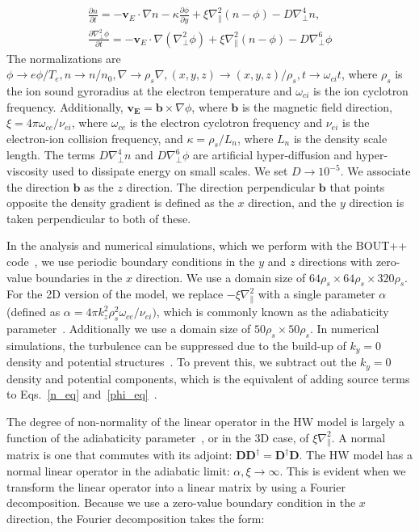 \documentclass[twocolumn,showkeys,superscriptaddress]{revtex4}
\def\beqar{\begin{eqnarray}}
\def\eeqar{\end{eqnarray}}
\newcommand{\pdiff}[2]{\frac{\partial#1}{\partial#2}}
\def\grad{\nabla}
\newcommand{\gradpar}{\grad_\parallel}
\newcommand{\gradperp}{\grad_\perp}
\begin{document}
\beqar
\label{n_eq}
\pdiff{n}{t} = - {\mathbf v_E} \cdot \grad n - \kappa \pdiff{\phi}{y} + \xi \gradpar^2 (n - \phi) - D \gradperp^4 n, \\
\label{phi_eq}
\pdiff{\gradperp^2 \phi}{t} = - {\mathbf v_E} \cdot \grad (\gradperp^2 \phi) + \xi \gradpar^2 (n - \phi) - D \gradperp^6 \phi
\eeqar
The normalizations are $\phi \to e \phi/T_e, n \to n/n_0, \grad \to \rho_s \grad , (x,y,z) \to (x,y,z)/\rho_s, t \to \omega_{ci} t $, where $\rho_s$ is the ion sound gyroradius at the electron temperature and $\omega_{ci}$ is
the ion cyclotron frequency. Additionally, $\mathbf{v_E} = \mathbf{b} \times \grad \phi$, where $\mathbf{b}$ is the magnetic field direction, $\xi = 4 \pi \omega_{ce}/\nu_{ei}$, where $\omega_{ce}$ is the electron cyclotron
frequency and $\nu_{ei}$ is the electron-ion collision frequency,
and $\kappa = \rho_s/L_n$, where $L_n$ is the density scale length. The terms $D \gradperp^4 n$ and $D \gradperp^6 \phi$ are artificial hyper-diffusion and hyper-viscosity used to dissipate
energy on small scales. We set $D \to 10^{-5}$.
We associate the direction $\mathbf{b}$ as the $z$ direction. The direction perpendicular $\mathbf{b}$ that
points opposite the density gradient is defined as the $x$ direction, and the $y$ direction is taken perpendicular to both of these.

In the analysis and numerical simulations, which we perform with the BOUT++ code~\cite{dudson2009}, we use periodic boundary conditions in
the $y$ and $z$ directions with zero-value boundaries in the $x$ direction. We use a domain size of $64 \rho_s \times 64 \rho_s \times 320 \rho_s$.
For the 2D version of the model, we replace $-\xi \gradpar^2$ with a single parameter $\alpha$ (defined as $\alpha = 4 \pi k_z^2 \rho_s^2 \omega_{ce} /\nu_{ei})$, 
which is commonly known as the adiabaticity parameter~\cite{camargo1995,camargo1998}. Additionally we use a domain size of $50 \rho_s \times 50 \rho_s$.
In numerical simulations, the turbulence can be suppressed due to the build-up of $k_y=0$ density and potential structures~\cite{biskamp1995}. To prevent this, we subtract out the $k_y=0$
density and potential components, which is the equivalent of adding source terms to Eqs.~\ref{n_eq} and~\ref{phi_eq}~\cite{friedman2012b}.

The degree of non-normality of the linear operator in the HW model is largely a function of the adiabaticity parameter~\cite{camargo1998}, or in the 3D case, of $\xi \gradpar^2$. 
A normal matrix is one that commutes with its adjoint: $\mathbf{D} \mathbf{D}^\dagger = \mathbf{D}^\dagger \mathbf{D}$.
The HW model has a normal linear operator in the adiabatic limit: $\alpha, \xi \to \infty$. 
This is evident when we transform the linear operator into a linear matrix by using a Fourier decomposition. Because we use a zero-value boundary condition in the $x$ direction, the
Fourier decomposition takes the form:
\end{document}
